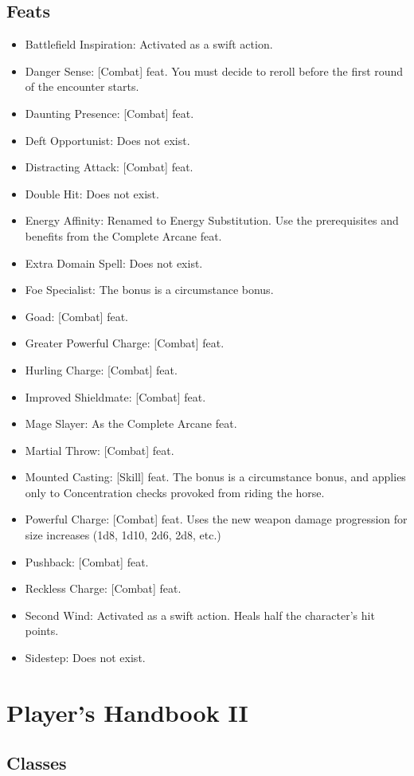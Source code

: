 \subsection{Feats}
\begin{itemize}
\item Battlefield Inspiration: Activated as a swift action.
\item Danger Sense: [Combat] feat. You must decide to reroll before the first round of the encounter starts.
\item Daunting Presence: [Combat] feat.
\item Deft Opportunist: Does not exist.
\item Distracting Attack: [Combat] feat.
\item Double Hit: Does not exist.
\item Energy Affinity: Renamed to Energy Substitution. Use the prerequisites and benefits from the Complete Arcane feat.
\item Extra Domain Spell: Does not exist.
\item Foe Specialist: The bonus is a circumstance bonus.
\item Goad: [Combat] feat.
\item Greater Powerful Charge: [Combat] feat.
\item Hurling Charge: [Combat] feat.
\item Improved Shieldmate: [Combat] feat.
\item Mage Slayer: As the Complete Arcane feat.
\item Martial Throw: [Combat] feat.
\item Mounted Casting: [Skill] feat. The bonus is a circumstance bonus, and applies only to Concentration checks provoked from riding the horse.
\item Powerful Charge: [Combat] feat. Uses the new weapon damage progression for size increases (1d8, 1d10, 2d6, 2d8, etc.)
\item Pushback: [Combat] feat.
\item Reckless Charge: [Combat] feat.
\item Second Wind: Activated as a swift action. Heals half the character's hit points.
\item Sidestep: Does not exist.
\end{itemize}

\section{Player's Handbook II}
\subsection{Classes}

